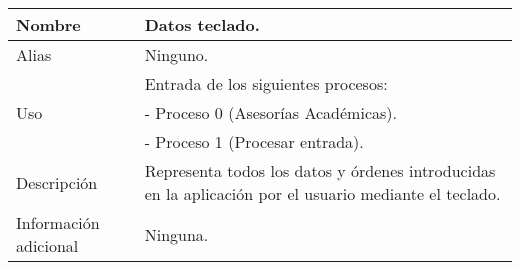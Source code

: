 \begin{center}
  \begin{tabular}{| l | p{9cm} |}
    \hline
    Nombre & \textbf{Datos teclado}.\\
    \hline
    Alias & Ninguno.\\
    \hline
    \multirow{3}{*}{Uso} & Entrada de los siguientes procesos:\\
                         & - Proceso 0 (Asesorías Académicas).\\
                         & - Proceso 1 (Procesar entrada).\\
    \hline
    Descripción & Representa todos los datos y órdenes introducidas en la
                  aplicación por el usuario mediante el teclado.\\
    \hline
    Información adicional & Ninguna.\\
    \hline
  \end{tabular}
\end{center}
